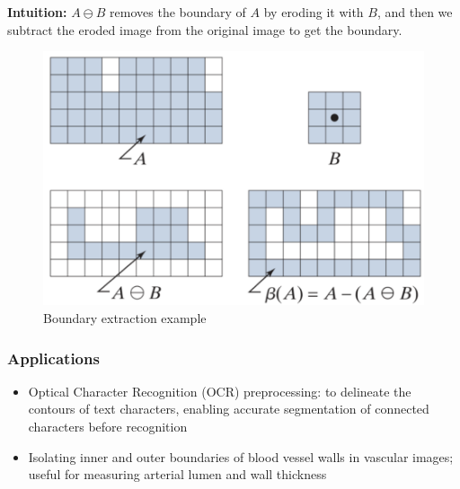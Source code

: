 \textbf{Intuition:} $A \ominus B$ removes the boundary of $A$ by
eroding it with $B$, and then we subtract the eroded image from the
original image to get the boundary.

\begin{figure}[H]
  \centering
  \includegraphics[width=\linewidth]{images/boundary_extraction.png}
  \caption{Boundary extraction example}
\end{figure}

\subsubsection*{Applications}

\begin{itemize}
  \item Optical Character Recognition (OCR) preprocessing: to
    delineate the contours of text characters, enabling accurate
    segmentation of connected characters before recognition
  \item Isolating inner and outer boundaries of blood vessel walls in
    vascular images; useful for measuring arterial lumen and wall thickness
\end{itemize}
